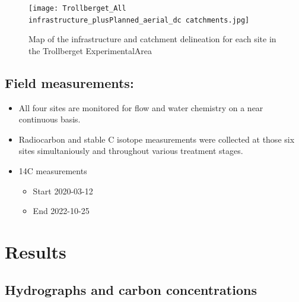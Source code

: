 \documentclass[
  letterpaper,
  DIV=11,
  numbers=noendperiod]{scrartcl}
\begin{document}
\begin{figure}[H]

{\centering \texttt{[image: Trollberget\_All infrastructure\_plusPlanned\_aerial\_dc catchments.jpg]}

}

\caption{Map of the infrastructure and catchment delineation for each
site in the Trollberget ExperimentalArea}

\end{figure}%

\subsection{Field measurements:}\label{field-measurements}

\begin{itemize}
\item
  All four sites are monitored for flow and water chemistry on a near
  continuous basis.
\item
  Radiocarbon and stable C isotope measurements were collected at those
  six sites simultaniously and throughout various treatment stages.
\item
  14C measurements

  \begin{itemize}
  \item
    Start 2020-03-12
  \item
    End 2022-10-25
  \end{itemize}
\end{itemize}

\section{Results}\label{results}

\subsection{Hydrographs and carbon
concentrations}\label{hydrographs-and-carbon-concentrations}
\end{document}
